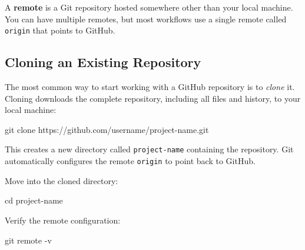 \documentclass[
  letterpaper,
  DIV=11,
  numbers=noendperiod]{scrreprt}
\newenvironment{Shaded}{\begin{snugshade}}{\end{snugshade}}
\newcommand{\AttributeTok}[1]{\textcolor[rgb]{0.40,0.45,0.13}{#1}}
\newcommand{\BuiltInTok}[1]{\textcolor[rgb]{0.00,0.23,0.31}{#1}}
\newcommand{\FunctionTok}[1]{\textcolor[rgb]{0.28,0.35,0.67}{#1}}
\newcommand{\NormalTok}[1]{\textcolor[rgb]{0.00,0.23,0.31}{#1}}
\begin{document}
A \textbf{remote} is a Git repository hosted somewhere other than your
local machine. You can have multiple remotes, but most workflows use a
single remote called \texttt{origin} that points to GitHub.

\subsection{Cloning an Existing
Repository}\label{cloning-an-existing-repository}

The most common way to start working with a GitHub repository is to
\emph{clone} it. Cloning downloads the complete repository, including
all files and history, to your local machine:

\begin{codelisting}

\caption{\texttt{terminal}}

\begin{Shaded}
\begin{Highlighting}[]
\FunctionTok{git}\NormalTok{ clone https://github.com/username/project{-}name.git}
\end{Highlighting}
\end{Shaded}

\end{codelisting}

This creates a new directory called \texttt{project-name} containing the
repository. Git automatically configures the remote \texttt{origin} to
point back to GitHub.

Move into the cloned directory:

\begin{codelisting}

\caption{\texttt{terminal}}

\begin{Shaded}
\begin{Highlighting}[]
\BuiltInTok{cd}\NormalTok{ project{-}name}
\end{Highlighting}
\end{Shaded}

\end{codelisting}

Verify the remote configuration:

\begin{codelisting}

\caption{\texttt{terminal}}

\begin{Shaded}
\begin{Highlighting}[]
\FunctionTok{git}\NormalTok{ remote }\AttributeTok{{-}v}
\end{Highlighting}
\end{Shaded}

\end{codelisting}
\end{document}
